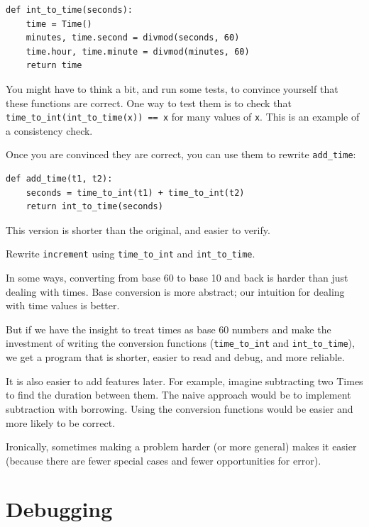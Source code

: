 \documentclass[10pt]{book}
\begin{document}
\begin{verbatim}
def int_to_time(seconds):
    time = Time()
    minutes, time.second = divmod(seconds, 60)
    time.hour, time.minute = divmod(minutes, 60)
    return time
\end{verbatim}
%
You might have to think a bit, and run some tests, to convince
yourself that these functions are correct.  One way to test them is to
check that \verb"time_to_int(int_to_time(x)) == x" for many values of
{\tt x}.  This is an example of a consistency check.

Once you are convinced they are correct, you can use them to 
rewrite \verb"add_time":

\begin{verbatim}
def add_time(t1, t2):
    seconds = time_to_int(t1) + time_to_int(t2)
    return int_to_time(seconds)
\end{verbatim}
%
This version is shorter than the original, and easier to verify.

\begin{exercise}

Rewrite {\tt increment} using \verb"time_to_int" and \verb"int_to_time".

\end{exercise}

In some ways, converting from base 60 to base 10 and back is harder
than just dealing with times.  Base conversion is more abstract; our
intuition for dealing with time values is better.

But if we have the insight to treat times as base 60 numbers and make
the investment of writing the conversion functions (\verb"time_to_int"
and \verb"int_to_time"), we get a program that is shorter, easier to
read and debug, and more reliable.

It is also easier to add features later.  For example, imagine
subtracting two Times to find the duration between them.  The
naive approach would be to implement subtraction with borrowing.
Using the conversion functions would be easier and more likely to be
correct.

Ironically, sometimes making a problem harder (or more general) makes it
easier (because there are fewer special cases and fewer opportunities
for error).


\section{Debugging}
\end{document}
